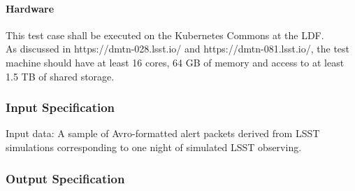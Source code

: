 \paragraph{Hardware}
This test case shall be executed on the Kubernetes Commons at the LDF.\\
As discussed in https://dmtn-028.lsst.io/ and https://dmtn-081.lsst.io/,
the test machine should have at least 16 cores, 64 GB of memory and
access to at least 1.5 TB of shared storage.


\subsubsection{Input Specification}
Input data: A sample of Avro-formatted alert packets derived from LSST
simulations corresponding to one night of simulated LSST observing.


\subsubsection{Output Specification}

